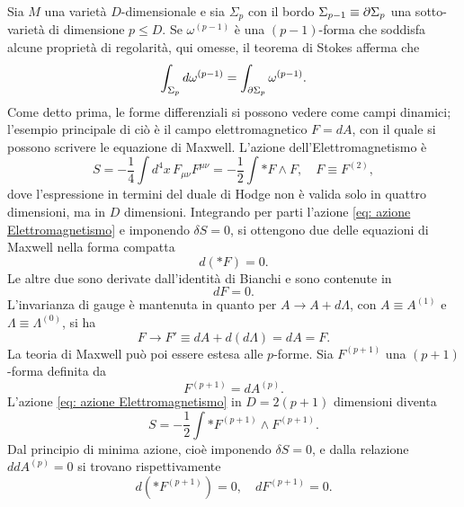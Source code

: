 Sia $M$ una varietà $D$-dimensionale e sia $\Sigma_p$ con il bordo $\Sigma_{p-1} \equiv \partial\Sigma_p$ una sotto-varietà di dimensione $p \le D$. Se $\omega^{(p - 1)}$ è una $(p - 1)$-forma che soddisfa alcune proprietà di regolarità, qui omesse, il teorema di Stokes afferma che 
\begin{equation}
    \int_{\Sigma_p}d\omega^{(p - 1)} = \int_{\partial\Sigma_{p}}\omega^{(p - 1)}.
\end{equation}
Come detto prima, le forme differenziali si possono vedere come campi dinamici; l'esempio principale di ciò è il campo elettromagnetico $F = dA$, con il quale si possono scrivere le equazione di Maxwell. L'azione dell'Elettromagnetismo è
\begin{equation}
\label{eq: azione Elettromagnetismo}
    S = -\frac{1}{4}\int d^4x\,F_{\mu\nu}F^{\mu\nu} = -\frac{1}{2}\int *F \wedge F,\quad F \equiv F^{(2)},
\end{equation}
dove l'espressione in termini del duale di Hodge non è valida solo in quattro dimensioni, ma in $D$ dimensioni. Integrando per parti l'azione \eqref{eq: azione Elettromagnetismo} e imponendo $\delta S = 0$, si ottengono due delle equazioni di Maxwell nella forma compatta
\begin{equation}
    d(*F) = 0.
\end{equation}
Le altre due sono derivate dall'identità di Bianchi e sono contenute in
\begin{equation}
    dF = 0.
\end{equation}
L'invarianza di gauge è mantenuta in quanto per $A \to A + d\Lambda$, con $A \equiv A^{(1)}$ e $\Lambda \equiv \Lambda^{(0)}$, si ha
\begin{equation}
    F \to F' \equiv dA + d(d\Lambda) = dA = F.
\end{equation}
La teoria di Maxwell può poi essere estesa alle $p$-forme. Sia $F^{(p+1)}$ una $(p + 1)$-forma definita da
\begin{equation}
    F^{(p + 1)} = dA^{(p)}.
\end{equation}
L'azione \eqref{eq: azione Elettromagnetismo} in $D = 2(p + 1)$ dimensioni diventa
\begin{equation}
    S = -\frac{1}{2}\int *F^{(p + 1)}\wedge F^{(p + 1)}.
\end{equation}
Dal principio di minima azione, cioè imponendo $\delta S = 0$, e dalla relazione $ddA^{(p)} = 0$ si trovano rispettivamente
\begin{equation}
    d(*F^{(p + 1)}) = 0,\quad dF^{(p + 1)} = 0.
\end{equation}
